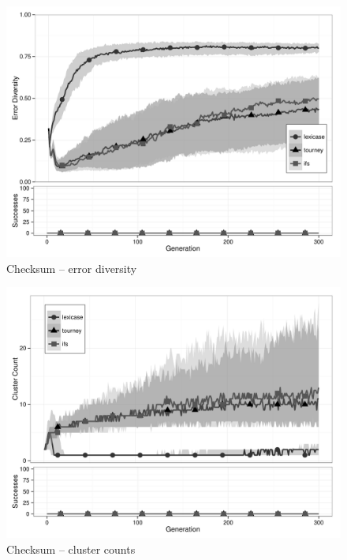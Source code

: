 \begin{figure}[p] %
\centering
\includegraphics[width=11.5cm]{checksum-diversity.pdf}
\caption{Checksum -- error diversity}
\label{checksumDiv}
\end{figure}

\begin{figure}[p] %
\centering
\includegraphics[width=11.5cm]{checksum-cluster.pdf}
\caption{Checksum -- cluster counts}
\label{checksumClu}
\end{figure}

